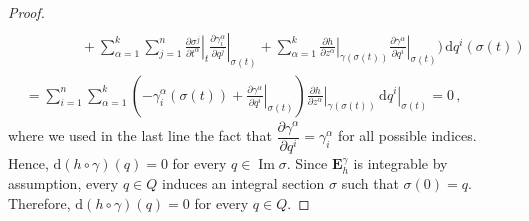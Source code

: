 \documentclass[10pt,a4paper]{amsart}
\DeclareMathOperator{\Ima}{Im}
\newcommand{\dd}{\mathrm{d}}
\newcommand\restr[2]{\left.#1\right|_{#2}} \newcommand{\bfX}{\mathbf{X}} \newcommand{\bfY}{\mathbf{Y}} \newcommand{\bfZ}{\mathbf{Z}} \newcommand{\qeddiamond}{\hfill $\diamond$} \newcommand{\parder}[2]{\frac{\partial #1}{\partial #2}} \newcommand{\dparder}[2]{\dfrac{\partial #1}{\partial #2}} \newcommand{\tparder}[2]{\partial #1/\partial #2} \newcommand{\parderr}[3]{\frac{\partial^2 #1}{\partial #2\partial #3}} \newcommand{\dparderr}[3]{\dfrac{\partial^2 #1}{\partial #2\partial #3}} \newcommand{\tparderr}[3]{\partial^2 #1/\partial #2\partial #3}
\begin{document}
\begin{proof}
\begin{align*}
\\
&\qquad\qquad
  + \sum_{\alpha=1}^k \sum_{j=1}^n
    \restr{\frac{\partial \sigma^j}{\partial t^\alpha}}{t}
    \restr{\frac{\partial \gamma^\alpha_i}{\partial q^j}}{\sigma(t)}
  + \sum_{\alpha=1}^k
    \restr{\frac{\partial h}{\partial z^\alpha}}{\gamma(\sigma(t))}
    \restr{\frac{\partial \gamma^\alpha}{\partial q^i}}{\sigma(t)}
\Bigg)
\, \dd q^i(\sigma(t))
\\[1ex]
&=
\sum_{i=1}^n
\sum_{\alpha=1}^k
\left(
  - \gamma_i^\alpha(\sigma(t))
  + \restr{\frac{\partial \gamma^\alpha}{\partial q^i}}{\sigma(t)}
\right)
\restr{\frac{\partial h}{\partial z^\alpha}}{\gamma(\sigma(t))}
\, \restr{\dd q^i}{\sigma(t)} = 0\,,
\end{align*}
where we used in the last line the fact that $\dfrac{\partial \gamma^\alpha}{\partial q^i} = \gamma^\alpha_i$ for all possible indices. Hence, $\dd(h\circ \gamma)(q) = 0$ for every $q\in \Ima \sigma$. Since $\mathbf{E}_h^\gamma$ is integrable by assumption, every $q\in Q$ induces an integral section $\sigma$ such that $\sigma(0) = q$. Therefore, $\dd(h\circ\gamma)(q) = 0$ for every $q\in Q$.


\end{proof}
\end{document}
